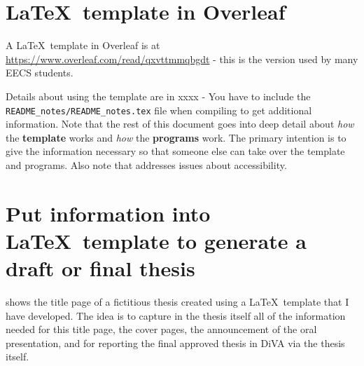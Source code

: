 \section{\LaTeX~template in Overleaf}
A \LaTeX~template in Overleaf is at \url{https://www.overleaf.com/read/qxvttmmqbgdt} - this is the version used by many EECS students.

Details about using the template are in  
{xxxx - You have to include the \texttt{README\_notes/README\_notes.tex} file when compiling to get additional information.}
Note that the rest of this document goes into deep detail about \textit{how} the \textbf{template} works and \textit{how} the \textbf{programs} work. The primary intention is to give the information necessary so that someone else can take over the template and programs. Also note that  addresses issues about accessibility.
 
\section{Put information into \LaTeX~template to generate a draft or final thesis}
\label{sec:putInformationIntoLatexTemplate}

 shows the title page of a fictitious thesis created using a \LaTeX~template that I have developed. The idea is to capture in the thesis itself all of the information needed for this title page, the cover pages, the announcement of the oral presentation, and for reporting the final approved thesis in DiVA via the thesis itself.


